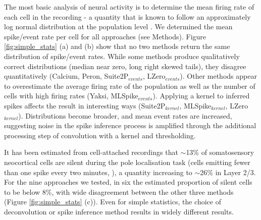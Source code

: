 \documentclass[a4paper,10pt,twocolumn]{article}
\begin{document}
The most basic analysis of neural activity is to determine the mean firing rate of each cell in the recording - a quantity that is known to follow an approximately log normal distribution at the population level \citep{Wohrer2013-rp}. We determined the mean spike/event rate per cell for all approaches (see Methods). Figure \ref{fig:simple_stats} (a) and (b) show that no two methods return the same distribution of spike/event rates. While some methods produce qualitatively correct distributions (median near zero, long right skewed tails), they disagree quantitatively (Calcium, Peron, Suite2P$_{events}$, LZero$_{events}$). Other methods appear to overestimate the average firing rate of the population as well as the number of cells with high firing rates (Yaksi, MLSpike$_{events}$). Applying a kernel to inferred spikes affects the result in interesting ways (Suite2P$_{kernel}$, MLSpike$_{kernel}$, LZero$_{kernel}$). Distributions become broader, and mean event rates are increased, suggesting noise in the spike inference process is amplified through the additional processing step of convolution with a kernel and thresholding.


It has been estimated from cell-attached recordings that $\sim$13\% of somatosensory neocortical cells are silent during the pole localisation task (cells emitting fewer than one spike every two minutes, \citealt{OConnor2010-hd}), a quantity increasing to $\sim$26\% in Layer 2/3. For the nine approaches we tested, in six the estimated proportion of silent cells to be below 8\%, with wide disagreement between the other three methods (Figure \ref{fig:simple_stats} (c)). Even for simple statistics, the choice of deconvolution or spike inference method results in widely different results.

\end{document}
